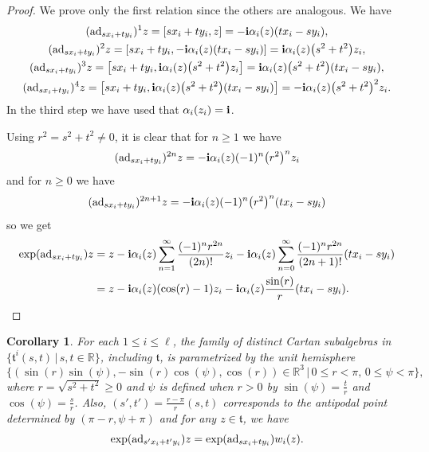 \documentclass[pdftex]{sigma}
\numberwithin{equation}{section}
\newtheorem{Corollary}[Theorem]{Corollary}
\def\R{\mathbb{R}}
\def\a{\alpha}
\def\bi{{\bf i}}
\def\ft{\mathfrak{t}}
\begin{document}
\begin{proof}We prove only the first relation since the others are analogous. We have
\begin{gather*}
({\rm ad}_{sx_i+ty_i})^1 z = [sx_i+ty_i,z] = -\bi\alpha_i(z) (tx_i-sy_i) ,\\
({\rm ad}_{sx_i+ty_i})^2 z = [sx_i+ty_i,-\bi\alpha_i(z) (tx_i-sy_i)] = \bi\alpha_i(z) \big(s^2+t^2\big) z_i ,\\
({\rm ad}_{sx_i+ty_i})^3 z = \big[sx_i+ty_i,\bi\alpha_i(z) \big(s^2+t^2\big) z_i\big] = \bi\alpha_i(z) \big(s^2+t^2\big)(tx_i-sy_i), \\
({\rm ad}_{sx_i+ty_i})^4 z = \big[sx_i+ty_i,\bi\alpha_i(z) \big(s^2+t^2\big)(tx_i-sy_i)\big] = -\bi\alpha_i(z) \big(s^2+t^2\big)^2 z_i .
\end{gather*}
In the third step we have used that $\a_i(z_i) = \bi$.

Using $r^2 = s^2+t^2 \neq 0$, it is clear that for $n\geq 1$ we have
\[({\rm ad}_{sx_i+ty_i})^{2n} z = -\bi\alpha_i(z) (-1)^n \big(r^2\big)^{n} z_i\]
and for $n\geq 0$ we have
\[({\rm ad}_{sx_i+ty_i})^{2n+1} z = -\bi\alpha_i(z) (-1)^n \big(r^2\big)^{n} (tx_i-sy_i)\]
so we get
\begin{align*}
\exp({\rm ad}_{sx_i+ty_i}) z & = z-\bi\alpha_i(z) \sum_{n=1}^\infty \frac{(-1)^n r^{2n}}{(2n)!} z_i -\bi\alpha_i(z)
\sum_{n=0}^\infty \frac{(-1)^n r^{2n}}{(2n+1)!} (tx_i-sy_i)\\
& = z -\bi\alpha_i(z) (\cos(r)-1) z_i -\bi\alpha_i(z) \frac{\sin(r)}{r} (tx_i-sy_i).\tag*{\qed}
\end{align*}\renewcommand{\qed}{}
\end{proof}

\begin{Corollary} \label{corollary:hemispherical_parametrization}
For each $1\leq i \leq \ell$, the family of distinct Cartan subalgebras in $\{\ft^i(s,t)\, |\, s,t\in\R\}$, including $\ft$, is parametrized by the unit hemisphere
\[\big\{(\sin(r)\sin(\psi),-\sin(r)\cos(\psi),\cos(r))\in\R^3\, |\, 0\leq r < \pi,\, 0\leq\psi<\pi\big\},\]
where $r = \sqrt{s^2 + t^2}\geq 0$ and $\psi$ is defined when $r > 0$ by
$\sin(\psi) = \frac{t}{r}$ and $\cos(\psi) = \frac{s}{r}$. Also, $(s',t') = \frac{r-\pi}{r}(s,t)$ corresponds to the antipodal
point determined by $(\pi-r,\psi+\pi)$ and for any $z\in\ft$, we have
\[\exp( {\rm ad}_{s'x_i+t'y_i}) z = \exp( {\rm ad}_{sx_i+ty_i}) w_i(z).\]
\end{Corollary}
\end{document}
